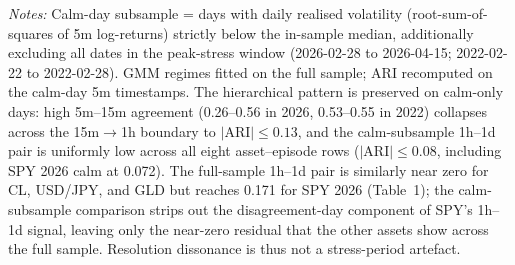 \documentclass[preprint,12pt,authoryear]{elsarticle}
\begin{document}
\begin{table}[H]
\centering
\small
\setlength{\tabcolsep}{4pt}
\caption{Calm-day-only subsample: full-sample vs.\ calm-only mean off-diag.\ ARI and pairwise structure.}
\label{tab:calm_day_subsample}
\par\medskip
{\footnotesize\justifying
\textit{Notes:} Calm-day subsample = days with daily realised volatility (root-sum-of-squares of 5m log-returns) strictly below the in-sample median, additionally excluding all dates in the peak-stress window (2026-02-28 to 2026-04-15; 2022-02-22 to 2022-02-28). GMM regimes fitted on the full sample; ARI recomputed on the calm-day 5m timestamps. The hierarchical pattern is preserved on calm-only days: high 5m--15m agreement (0.26--0.56 in 2026, 0.53--0.55 in 2022) collapses across the 15m$\to$1h boundary to $|\text{ARI}|\le 0.13$, and the calm-subsample 1h--1d pair is uniformly low across all eight asset--episode rows ($|\text{ARI}|\le 0.08$, including SPY 2026 calm at 0.072). The full-sample 1h--1d pair is similarly near zero for CL, USD/JPY, and GLD but reaches 0.171 for SPY 2026 (Table~1); the calm-subsample comparison strips out the disagreement-day component of SPY's 1h--1d signal, leaving only the near-zero residual that the other assets show across the full sample. Resolution dissonance is thus not a stress-period artefact.
\par}
\end{table}
\end{document}
